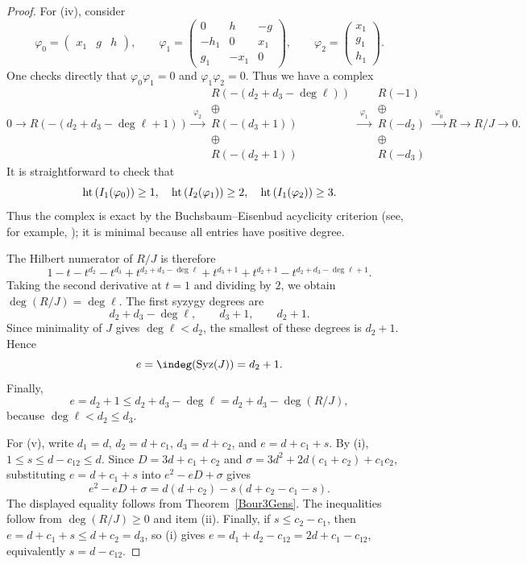 \documentclass[11pt]{amsart} %
\theoremstyle{definition}
\def\phi{\varphi}
\def\hht{{\rm ht}\,}
\def\syz{\mbox{\rm Syz}}
\def\phi{\varphi}
\def\hht{{\rm ht}\,}
\begin{document}
\begin{proof}
For {\rm(iv)}, consider
\[
\phi_0=\begin{pmatrix}x_1&g&h\end{pmatrix}, \qquad \phi_1=
\begin{pmatrix}
0 & h & -g\\
-h_1 & 0 & x_1\\
g_1 & -x_1 & 0
\end{pmatrix},
\qquad
\phi_2=
\begin{pmatrix}
x_1\\
g_1\\
h_1
\end{pmatrix}.
\]
One checks directly that $\phi_0\phi_1=0$ and $\phi_1\phi_2=0$. Thus we have a
complex
\[
0\to R(-(d_2+d_3-\deg\ell+1))
\xrightarrow{\ \phi_2\ }
\begin{matrix}
R(-(d_2+d_3-\deg\ell))\\
\oplus\\
R(-(d_3+1))\\
\oplus\\
R(-(d_2+1))
\end{matrix}
\xrightarrow{\ \phi_1\ }
\begin{matrix}
R(-1)\\
\oplus\\
R(-d_2)\\
\oplus\\
R(-d_3)
\end{matrix}
\xrightarrow{\ \phi_0\ }
R\to R/J\to0.
\]
It is straightforward to check that 
$$
\hht(I_1(\varphi_0)) \geq 1, \quad \hht(I_2(\varphi_1)) \geq 2, \quad \hht(I_1(\varphi_2)) \geq 3.
$$
Thus the complex is exact by the Buchsbaum--Eisenbud acyclicity criterion (see, for example, \cite[Theorem~1.4.13]{bruns1998cohen}); it is minimal because all entries have positive degree.

The Hilbert numerator of $R/J$ is therefore
\[
1-t-t^{d_2}-t^{d_3}
+t^{d_2+d_3-\deg\ell}+t^{d_3+1}+t^{d_2+1}
-t^{d_2+d_3-\deg\ell+1}.
\]
Taking the second derivative at $t=1$ and dividing by $2$, we obtain $\deg(R/J)=\deg\ell$.
The first syzygy degrees are
\[
d_2+d_3-\deg\ell,\qquad d_3+1,\qquad d_2+1.
\]
Since minimality of $J$ gives $\deg\ell<d_2$, the smallest of these degrees is
$d_2+1$. Hence
\[
e=\indeg(\syz(J))=d_2+1.
\]
Finally,
\[
e=d_2+1\le d_2+d_3-\deg\ell
=d_2+d_3-\deg(R/J),
\]
because $\deg\ell<d_2\le d_3$.





For \rm(v), write $d_1=d$, $d_2=d+c_1$, $d_3=d+c_2$, and $e=d+c_1+s$. By \rm(i), $1\le s\le d-c_{12}\le d$. Since $D=3d+c_1+c_2$ and $\sigma=3d^2+2d(c_1+c_2)+c_1c_2$, substituting $e=d+c_1+s$ into $e^2-eD+\sigma$ gives
\[
e^2-eD+\sigma=d(d+c_2)-s(d+c_2-c_1-s).
\]
The displayed equality follows from Theorem~\ref{Bour3Gens}. The inequalities follow from $\deg(R/J)\ge0$ and item \rm(ii). Finally, if $s\le c_2-c_1$, then $e=d+c_1+s\le d+c_2=d_3$, so \rm(i) gives $e=d_1+d_2-c_{12}=2d+c_1-c_{12}$, equivalently $s=d-c_{12}$.


\end{proof}
\end{document}
